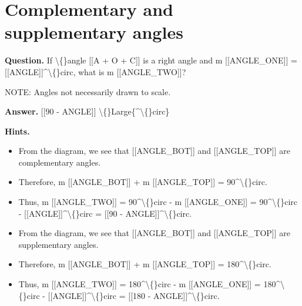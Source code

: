 \documentclass{article}
\begin{document}
\section*{Complementary and supplementary angles}
\textbf{Question.} If \textbackslash\{\}angle [[A + O + C]] is a right angle and m [[ANGLE\_ONE]] = [[ANGLE]]\textasciicircum{}\textbackslash\{\}circ, what is m [[ANGLE\_TWO]]?
                
                
                NOTE: Angles not necessarily drawn to scale.

\textbf{Answer.} [[90 - ANGLE]] \textbackslash\{\}Large\{\textasciicircum{}\textbackslash\{\}circ\}

\textbf{Hints.}
\begin{itemize}
  \item From the diagram, we see that [[ANGLE\_BOT]] and [[ANGLE\_TOP]] are complementary angles.
  \item Therefore, m [[ANGLE\_BOT]] + m [[ANGLE\_TOP]] = 90\textasciicircum{}\textbackslash\{\}circ.
  \item Thus, m [[ANGLE\_TWO]] = 90\textasciicircum{}\textbackslash\{\}circ - m [[ANGLE\_ONE]] = 90\textasciicircum{}\textbackslash\{\}circ - [[ANGLE]]\textasciicircum{}\textbackslash\{\}circ = [[90 - ANGLE]]\textasciicircum{}\textbackslash\{\}circ.
  \item From the diagram, we see that [[ANGLE\_BOT]] and [[ANGLE\_TOP]] are supplementary angles.
  \item Therefore, m [[ANGLE\_BOT]] + m [[ANGLE\_TOP]] = 180\textasciicircum{}\textbackslash\{\}circ.
  \item Thus, m [[ANGLE\_TWO]] = 180\textasciicircum{}\textbackslash\{\}circ - m [[ANGLE\_ONE]] = 180\textasciicircum{}\textbackslash\{\}circ - [[ANGLE]]\textasciicircum{}\textbackslash\{\}circ = [[180 - ANGLE]]\textasciicircum{}\textbackslash\{\}circ.
\end{itemize}
\end{document}
